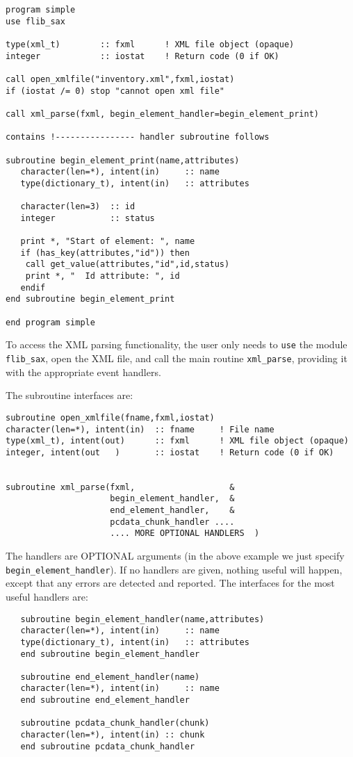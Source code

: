 \documentclass[11pt]{article}
\begin{document}
\begin{verbatim}
program simple
use flib_sax

type(xml_t)        :: fxml      ! XML file object (opaque)
integer            :: iostat    ! Return code (0 if OK)

call open_xmlfile("inventory.xml",fxml,iostat)
if (iostat /= 0) stop "cannot open xml file"

call xml_parse(fxml, begin_element_handler=begin_element_print)

contains !---------------- handler subroutine follows

subroutine begin_element_print(name,attributes)
   character(len=*), intent(in)     :: name
   type(dictionary_t), intent(in)   :: attributes
   
   character(len=3)  :: id
   integer           :: status
   
   print *, "Start of element: ", name
   if (has_key(attributes,"id")) then
   	call get_value(attributes,"id",id,status)
	print *, "  Id attribute: ", id
   endif
end subroutine begin_element_print

end program simple
\end{verbatim}
%
To access the XML parsing functionality, the user only needs to \texttt{use}
the module \texttt{flib\_sax}, open the XML file, and call the main routine
\texttt{xml\_parse}, providing it with the appropriate event handlers.

The subroutine interfaces are:

\begin{verbatim}
subroutine open_xmlfile(fname,fxml,iostat)
character(len=*), intent(in)  :: fname     ! File name
type(xml_t), intent(out)      :: fxml      ! XML file object (opaque)
integer, intent(out   )       :: iostat    ! Return code (0 if OK)


subroutine xml_parse(fxml,                   &
                     begin_element_handler,  &
                     end_element_handler,    &
                     pcdata_chunk_handler ....
                     .... MORE OPTIONAL HANDLERS  )

\end{verbatim}

The handlers are OPTIONAL arguments (in the above example we just
specify \texttt{begin\_element\_handler}). If no handlers are given,
nothing useful will happen, except that any errors are detected and
reported.  The interfaces for the most useful handlers are:

\begin{verbatim}    
   subroutine begin_element_handler(name,attributes)
   character(len=*), intent(in)     :: name
   type(dictionary_t), intent(in)   :: attributes
   end subroutine begin_element_handler

   subroutine end_element_handler(name)
   character(len=*), intent(in)     :: name
   end subroutine end_element_handler

   subroutine pcdata_chunk_handler(chunk)
   character(len=*), intent(in) :: chunk
   end subroutine pcdata_chunk_handler
\end{verbatim}
\end{document}
